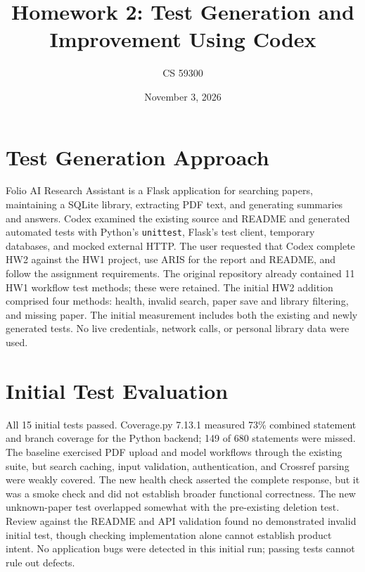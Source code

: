 \documentclass[10pt]{article}
\title{Homework 2: Test Generation and Improvement Using Codex}
\author{CS 59300}
\date{November 3, 2026}
\begin{document}
\maketitle
\section{Test Generation Approach}
Folio AI Research Assistant is a Flask application for searching papers, maintaining a SQLite library, extracting PDF text, and generating summaries and answers. Codex examined the existing source and README and generated automated tests with Python's \texttt{unittest}, Flask's test client, temporary databases, and mocked external HTTP. The user requested that Codex complete HW2 against the HW1 project, use ARIS for the report and README, and follow the assignment requirements. The original repository already contained 11 HW1 workflow test methods; these were retained. The initial HW2 addition comprised four methods: health, invalid search, paper save and library filtering, and missing paper. The initial measurement includes both the existing and newly generated tests. No live credentials, network calls, or personal library data were used.

\section{Initial Test Evaluation}
All 15 initial tests passed. Coverage.py 7.13.1 measured 73\% combined statement and branch coverage for the Python backend; 149 of 680 statements were missed. The baseline exercised PDF upload and model workflows through the existing suite, but search caching, input validation, authentication, and Crossref parsing were weakly covered. The new health check asserted the complete response, but it was a smoke check and did not establish broader functional correctness. The new unknown-paper test overlapped somewhat with the pre-existing deletion test. Review against the README and API validation found no demonstrated invalid initial test, though checking implementation alone cannot establish product intent. No application bugs were detected in this initial run; passing tests cannot rule out defects.
\end{document}

